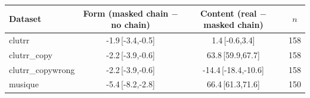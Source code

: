 \begin{tabular}{lccc}
\toprule
Dataset & Form (masked chain $-$ no chain) & Content (real $-$ masked chain) & $n$ \\
\midrule
clutrr & -1.9\,{\scriptsize[-3.4,-0.5]} & 1.4\,{\scriptsize[-0.6,3.4]} & 158 \\
clutrr\_copy & -2.2\,{\scriptsize[-3.9,-0.6]} & 63.8\,{\scriptsize[59.9,67.7]} & 158 \\
clutrr\_copywrong & -2.2\,{\scriptsize[-3.9,-0.6]} & -14.4\,{\scriptsize[-18.4,-10.6]} & 158 \\
musique & -5.4\,{\scriptsize[-8.2,-2.8]} & 66.4\,{\scriptsize[61.3,71.6]} & 150 \\
\bottomrule
\end{tabular}
